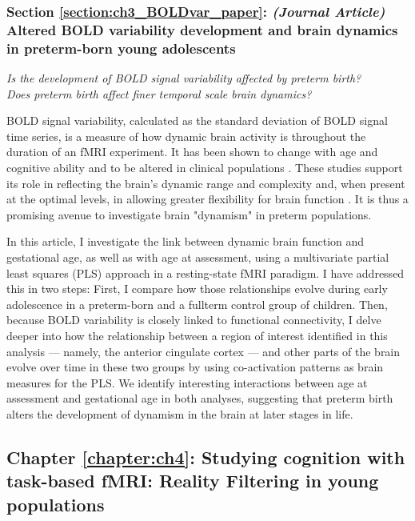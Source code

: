 \subsubsection*{Section \ref{section:ch3_BOLDvar_paper}: \textit{(Journal Article)} Altered BOLD variability development and brain dynamics in preterm-born young adolescents}
\textit{Is the development of BOLD signal variability affected by preterm birth?}\\
\textit{Does preterm birth affect finer temporal scale brain dynamics?}

BOLD signal variability, calculated as the standard deviation of BOLD signal time series, is a measure of how dynamic brain activity is throughout the duration of an fMRI experiment. It has been shown to change with age and cognitive ability \citep{Garrett2013} and to be altered in clinical populations \citep{Zoller2017,Nomi2018, Easson2019}. These studies support its role in reflecting the brain's dynamic range and complexity and, when present at the optimal levels, in allowing greater flexibility for brain function \citep{McIntosh2010, Deco2011}. It is thus a promising avenue to investigate brain "dynamism" in preterm populations. 

In this article, I investigate the link between dynamic brain function and gestational age, as well as with age at assessment, using a multivariate partial least squares (PLS) approach in a resting-state fMRI paradigm. I have addressed this in two steps: First, I compare how those relationships evolve during early adolescence in a preterm-born and a fullterm control group of children. Then, because BOLD variability is closely linked to functional connectivity, I delve deeper into how the relationship between a region of interest identified in this analysis --- namely, the anterior cingulate cortex --- and other parts of the brain evolve over time in these two groups by using co-activation patterns as brain measures for the PLS. We identify interesting interactions between age at assessment and gestational age in both analyses, suggesting that preterm birth alters the development of dynamism in the brain at later stages in life. 


\subsection*{Chapter \ref{chapter:ch4}: Studying cognition with task-based fMRI: Reality Filtering in young populations}

